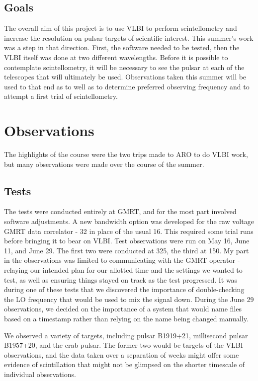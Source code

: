 \documentclass[a4paper,12pt]{article}
\begin{document}
\subsection{Goals}
\label{sec:goals}

The overall aim of this project is to use VLBI to perform scintellometry and increase the resolution on pulsar targets of scientific interest. This summer’s work was a step in that direction. First, the software needed to be tested, then the VLBI itself was done at two different wavelengths. Before it is possible to contemplate scintellometry, it will be necessary to see the pulsar at each of the telescopes that will ultimately be used. Observations taken this summer will be used to that end as to well as to determine preferred observing frequency and to attempt a first trial of scintellometry.


\section{Observations}
\label{observations}
The highlights of the course were the two trips made to ARO to do VLBI work, but many observations were made over the course of the summer.

\subsection{Tests}
\label{tests}
The tests were conducted entirely at GMRT, and for the most part involved software adjustments. A new bandwidth option was developed for the raw voltage GMRT data correlator - \unit{32}{\mega\hertz} in place of the usual 16. This required some trial runs before bringing it to bear on VLBI. Test observations were run on May 16, June 11, and June 29. The first two were conducted at \unit{325}{\mega\hertz}, the third at \unit{150}{\mega\hertz}. My part in the observations was limited to communicating with the GMRT operator - relaying our intended plan for our allotted time and the settings we wanted to test, as well as ensuring things stayed on track as the test progressed. It was during one of these tests that we discovered the importance of double-checking the LO frequency that would be used to mix the signal down. During the June 29 observations, we decided on the importance of a system that would name files based on a timestamp rather than relying on the name being changed manually. 

We observed a variety of targets, including pulsar B1919+21, millisecond pulsar B1957+20, and the crab pulsar. The former two would be targets of the VLBI observations, and the data taken over a separation of weeks might offer some evidence of scintillation that might not be glimpsed on the shorter timescale of individual observations.
\end{document}
